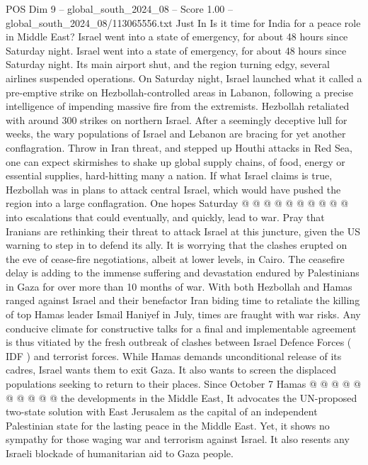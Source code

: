 \begin{textsample}{POS Dim 9 – global\_south\_2024\_08 – Score 1.00 – global\_south\_2024\_08/113065556.txt}  \label{ex:f9_pos_061}
Just In Is it time for India for a peace role in Middle East?
Israel went into a state of emergency, for about 48 hours since Saturday night.
Israel went into a state of emergency, for about 48 hours since Saturday night.
Its main airport shut, and the region turning edgy, several airlines suspended operations.
On Saturday night, Israel launched what it called a pre-emptive strike on Hezbollah-controlled areas in Labanon, following a precise intelligence of impending massive fire from the extremists.
Hezbollah retaliated with around 300 strikes on northern Israel.
After a seemingly deceptive lull for weeks, the wary populations of Israel and Lebanon are bracing for yet another conflagration.
Throw in Iran threat, and stepped up Houthi attacks in Red Sea, one can expect skirmishes to shake up global supply chains, of food, energy or essential supplies, hard-hitting many a nation.
If what Israel claims is true, Hezbollah was in plans to attack central Israel, which would have pushed the region into a large conflagration.
One hopes Saturday @ @ @ @ @ @ @ @ @ @ into escalations that could eventually, and quickly, lead to war.
Pray that Iranians are rethinking their threat to attack Israel at this juncture, given the US warning to step in to defend its ally.
It is worrying that the clashes erupted on the eve of cease-fire negotiations, albeit at lower levels, in Cairo.
The ceasefire delay is adding to the immense suffering and devastation endured by Palestinians in Gaza for over more than 10 months of war.
With both Hezbollah and Hamas ranged against Israel and their benefactor Iran biding time to retaliate the killing of top Hamas leader Ismail Haniyef in July, times are fraught with war risks.
Any conducive climate for constructive talks for a final and implementable agreement is thus vitiated by the fresh outbreak of clashes between Israel Defence Forces ( IDF ) and terrorist forces.
While Hamas demands unconditional release of its cadres, Israel wants them to exit Gaza.
It also wants to screen the displaced populations seeking to return to their places.
Since October 7 Hamas @ @ @ @ @ @ @ @ @ @ the developments in the Middle East, It advocates the UN-proposed two-state solution with East Jerusalem as the capital of an independent Palestinian state for the lasting peace in the Middle East.
Yet, it shows no sympathy for those waging war and terrorism against Israel.
It also resents any Israeli blockade of humanitarian aid to Gaza people.

\end{textsample}
